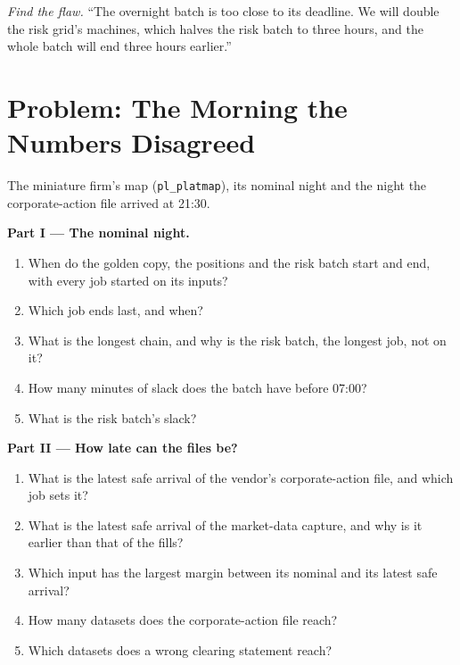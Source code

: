 \begin{exercise}[$\star\star\star$]\label{exo:pl:the-platform-map:8}
\emph{Find the flaw.} ``The overnight batch is too close to its deadline. We will double the risk grid's machines, which halves
the risk batch to three hours, and the whole batch will end three hours earlier.''
\end{exercise}

\section{Problem: The Morning the Numbers Disagreed}

\begin{problem}\label{pb:pl:the-platform-map:1}
The miniature firm's map (\texttt{pl\_platmap}), its nominal night and the night the corporate-action file arrived at 21:30.

\medskip\noindent\textbf{Part I --- The nominal night.}
\begin{enumerate}
\item When do the golden copy, the positions and the risk batch start and end, with every job started on its inputs?
\item Which job ends last, and when?
\item What is the longest chain, and why is the risk batch, the longest job, not on it?
\item How many minutes of slack does the batch have before 07:00?
\item What is the risk batch's slack?
\end{enumerate}

\medskip\noindent\textbf{Part II --- How late can the files be?}
\begin{enumerate}[resume]
\item What is the latest safe arrival of the vendor's corporate-action file, and which job sets it?
\item What is the latest safe arrival of the market-data capture, and why is it earlier than that of the fills?
\item Which input has the largest margin between its nominal and its latest safe arrival?
\item How many datasets does the corporate-action file reach?
\item Which datasets does a wrong clearing statement reach?
\end{enumerate}


\end{problem}
